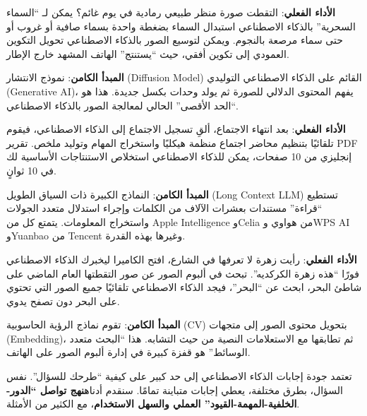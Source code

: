 
\textbf{الأداء الفعلي}: التقطت صورة منظر طبيعي رمادية في يوم غائم؟ يمكن لـ “السماء السحرية” بالذكاء الاصطناعي استبدال السماء بضغطة واحدة بسماء صافية أو غروب أو حتى سماء مرصعة بالنجوم. ويمكن لتوسيع الصور بالذكاء الاصطناعي تحويل التكوين العمودي إلى تكوين أفقي، حيث “يستنتج” الهاتف المشهد خارج الإطار.

\textbf{المبدأ الكامن}: نموذج الانتشار (Diffusion Model) القائم على الذكاء الاصطناعي التوليدي (Generative AI)، يفهم المحتوى الدلالي للصورة ثم يولد وحدات بكسل جديدة. هذا هو “الحد الأقصى” الحالي لمعالجة الصور بالذكاء الاصطناعي.


\textbf{الأداء الفعلي}: بعد انتهاء الاجتماع، ألقِ تسجيل الاجتماع إلى الذكاء الاصطناعي، فيقوم تلقائيًا بتنظيم محاضر اجتماع منظمة هيكليًا واستخراج المهام وتوليد ملخص. تقرير PDF إنجليزي من 10 صفحات، يمكن للذكاء الاصطناعي استخلاص الاستنتاجات الأساسية لك في 10 ثوانٍ.

\textbf{المبدأ الكامن}: النماذج الكبيرة ذات السياق الطويل (Long Context LLM) تستطيع “قراءة” مستندات بعشرات الآلاف من الكلمات وإجراء استدلال متعدد الجولات واستخراج المعلومات. يتمتع كل من Apple Intelligence وCelia من هواوي وWPS AI وYuanbao من Tencent وغيرها بهذه القدرة.


\textbf{الأداء الفعلي}: رأيت زهرة لا تعرفها في الشارع، افتح الكاميرا ليخبرك الذكاء الاصطناعي فورًا “هذه زهرة الكركديه”. تبحث في ألبوم الصور عن صور التقطتها العام الماضي على شاطئ البحر، ابحث عن “البحر”، فيجد الذكاء الاصطناعي تلقائيًا جميع الصور التي تحتوي على البحر دون تصفح يدوي.

\textbf{المبدأ الكامن}: تقوم نماذج الرؤية الحاسوبية (CV) بتحويل محتوى الصور إلى متجهات (Embedding)، ثم تطابقها مع الاستعلامات النصية من حيث التشابه. هذا “البحث متعدد الوسائط” هو قفزة كبيرة في إدارة ألبوم الصور على الهاتف.


تعتمد جودة إجابات الذكاء الاصطناعي إلى حد كبير على كيفية “طرحك للسؤال”. نفس السؤال، بطرق مختلفة، يعطي إجابات متباينة تمامًا. سنقدم أدناه\textbf{نهج تواصل “الدور-الخلفية-المهمة-القيود” العملي والسهل الاستخدام}، مع الكثير من الأمثلة.

